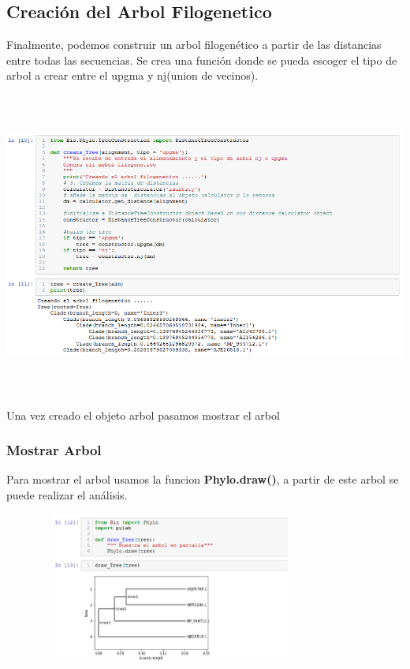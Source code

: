 \documentclass[a4paper]{article}
\begin{document}
\subsection{Creación del Arbol Filogenetico}
Finalmente, podemos construir un arbol filogenético a partir de las distancias entre todas las secuencias.
Se crea una función donde se pueda escoger el tipo de arbol a crear entre el upgma y nj(union de vecinos).

\begin{center}
	\includegraphics[width=16cm,height=10cm]{CrearArbol.png}
\end{center}
Una vez creado el objeto arbol pasamos mostrar el arbol

\subsubsection*{Mostrar Arbol}
Para mostrar el arbol usamos la funcion \textbf{Phylo.draw()}, a partir de este arbol se puede realizar el análisis.
 
\noindent 
\begin{center}
	\includegraphics[width=11cm,height=5cm]{mostrarArbol.png}
\end{center}
\end{document}
